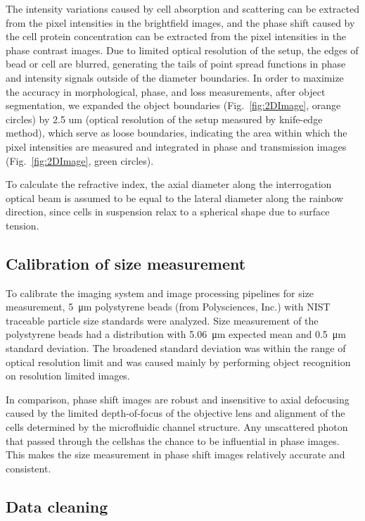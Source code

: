 \documentclass[aps,pra,reprint,superscriptaddress]{revtex4-1}
\begin{document}
The intensity variations caused by cell absorption and scattering can be extracted from the pixel intensities in the brightfield images, and the phase shift caused by the cell protein concentration can be extracted from the pixel intensities in the phase contrast images. Due to limited optical resolution of the setup, the edges of bead or cell are blurred, generating the tails of point spread functions in phase and intensity signals outside of the diameter boundaries. In order to maximize the accuracy in morphological, phase, and loss measurements, after object segmentation, we expanded the object boundaries (Fig.~\ref{fig:2DImage}, orange circles) by 2.5 um (optical resolution of the setup measured by knife-edge method), which serve as loose boundaries, indicating the area within which the pixel intensities are measured and integrated in phase and transmission images (Fig.~\ref{fig:2DImage}, green circles).

To calculate the refractive index, the axial diameter along the interrogation optical beam is assumed to be equal to the lateral diameter along the rainbow direction, since cells in suspension relax to a spherical shape due to surface tension.

\subsection{Calibration of size measurement}

To calibrate the imaging system and image processing pipelines for size measurement, \SI{5}{\micro\meter} polystyrene beads (from Polysciences, Inc.) with NIST traceable particle size standards were analyzed. Size measurement of the polystyrene beads had a distribution with \SI{5.06}{\micro\meter} expected mean and \SI{0.5}{\micro\meter} standard deviation. The broadened standard deviation was within the range of optical resolution limit and was caused mainly by performing object recognition on resolution limited images.

In comparison, phase shift images are robust and insensitive to axial defocusing \cite{spadinger1990effect} caused by the limited depth-of-focus of the objective lens and alignment of the cells determined by the microfluidic channel structure. Any unscattered photon that passed through the cellshas the chance to be influential in phase images. This makes the size measurement in phase shift images relatively accurate and consistent. 

\subsection{Data cleaning}
\end{document}
